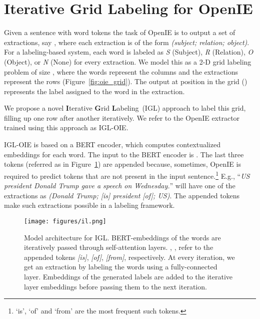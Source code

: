 \documentclass[11pt,a4paper]{article}
\newcommand{\shortname}{{\scshape IGL}}
\newcommand{\boldlongname}{\textbf{I}terative \textbf{G}rid \textbf{L}abeling}
\begin{document}
 

\section{Iterative Grid Labeling for OpenIE}
\label{sec:il}
Given a sentence with word tokens  the task of OpenIE is to output a set of extractions, say , where each extraction is of the form \textit{(subject; relation; object)}. For a labeling-based system, each word is labeled as \textit{S} (Subject), \textit{R} (Relation), \textit{O} (Object), or \textit{N} (None) for every extraction. We model this as a  2-D grid labeling problem of size , where the words represent the columns and the extractions represent the rows (Figure~\ref{fig:oie_grid}). The output at position  in the grid () represents the label assigned to the  word in the  extraction. 

We propose a novel \boldlongname\ (\shortname) approach to label this grid, filling up one row after another iteratively. We refer to the OpenIE extractor trained using this approach as \shortname-OIE.

\shortname-OIE is based on a BERT encoder, which computes contextualized embeddings for each word. The input to the BERT encoder is  . The last three tokens (referred as  in Figure~\ref{fig:model_architecture}) are appended because, sometimes, OpenIE is required to predict tokens that are not present in the input sentence.\footnote{`is', `of' and `from' are the most frequent such tokens.}  E.g., ``\textit{US president Donald Trump gave a speech on Wednesday.}'' will have one of the extractions as \textit{(Donald Trump; [is] president [of]; US)}. The appended tokens make such extractions possible in a labeling framework.

\begin{figure}[t]
\centering
\texttt{[image: figures/il.png]}
\hfill
\vspace*{-3ex}
\caption{Model architecture for \shortname. BERT-embeddings of the words are iteratively passed through self-attention layers. , ,  refer to the appended tokens \emph{[is]}, \emph{[of]}, \emph{[from]}, respectively. At every iteration, we get an extraction by labeling the words using a fully-connected layer. Embeddings of the generated labels are added to the iterative layer embeddings before passing them to the next iteration.} 
\label{fig:model_architecture}
\end{figure}
\end{document}
